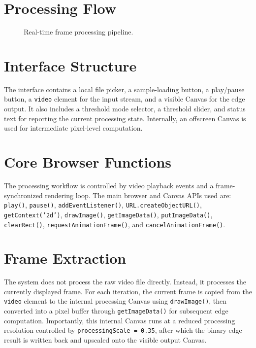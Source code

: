 \section{Processing Flow}
\begin{figure}[!htbp]
  \centering
  \caption{Real-time frame processing pipeline.}
\end{figure}

\section{Interface Structure}
The interface contains a local file picker, a sample-loading button, a play/pause button, a \texttt{video} element for the input stream, and a visible Canvas for the edge output. It also includes a threshold mode selector, a threshold slider, and status text for reporting the current processing state. Internally, an offscreen Canvas is used for intermediate pixel-level computation.

\section{Core Browser Functions}
The processing workflow is controlled by video playback events and a frame-synchronized rendering loop. The main browser and Canvas APIs used are:
\texttt{play()}, \texttt{pause()}, \texttt{addEventListener()}, \texttt{URL.createObjectURL()},
\texttt{getContext('2d')}, \texttt{drawImage()}, \texttt{getImageData()}, \texttt{putImageData()},
\texttt{clearRect()}, \texttt{requestAnimationFrame()}, and \texttt{cancelAnimationFrame()}.

\section{Frame Extraction}
The system does not process the raw video file directly. Instead, it processes the currently displayed frame. For each iteration, the current frame is copied from the \texttt{video} element to the internal processing Canvas using \texttt{drawImage()}, then converted into a pixel buffer through \texttt{getImageData()} for subsequent edge computation. Importantly, this internal Canvas runs at a reduced processing resolution controlled by \texttt{processingScale = 0.35}, after which the binary edge result is written back and upscaled onto the visible output Canvas.

